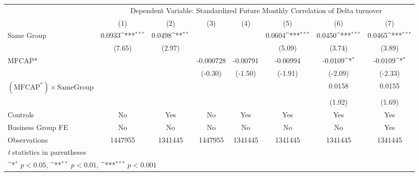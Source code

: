 {
\def\sym#1{\ifmmode^{#1}\else\(^{#1}\)\fi}
\begin{tabular}{l*{7}{c}}
\hline\hline
                &\multicolumn{7}{c}{Dependent Variable: Standardized Future Monthly Correlation of Delta turnover}                                   \\\cmidrule(lr){2-8}
                &\multicolumn{1}{c}{(1)}         &\multicolumn{1}{c}{(2)}         &\multicolumn{1}{c}{(3)}         &\multicolumn{1}{c}{(4)}         &\multicolumn{1}{c}{(5)}         &\multicolumn{1}{c}{(6)}         &\multicolumn{1}{c}{(7)}         \\
\hline
Same Group      &   0.0933\sym{***}&   0.0498\sym{**} &                  &                  &   0.0604\sym{***}&   0.0450\sym{***}&   0.0465\sym{***}\\
                &   (7.65)         &   (2.97)         &                  &                  &   (5.09)         &   (3.74)         &   (3.89)         \\
[1em]
$ \text{MFCAP*} $&                  &                  &-0.000728         & -0.00791         & -0.00994         &  -0.0109\sym{*}  &  -0.0109\sym{*}  \\
                &                  &                  &  (-0.30)         &  (-1.50)         &  (-1.91)         &  (-2.09)         &  (-2.33)         \\
[1em]
 $ (\text{MFCAP}^*) \times {\text{SameGroup} }  $ &                  &                  &                  &                  &                  &   0.0158         &   0.0155         \\
                &                  &                  &                  &                  &                  &   (1.92)         &   (1.69)         \\
\hline
Controls        &       No         &      Yes         &       No         &      Yes         &      Yes         &      Yes         &      Yes         \\
Business Group FE&       No         &       No         &       No         &       No         &       No         &       No         &      Yes         \\
Observations    &  1447955         &  1341445         &  1447955         &  1341445         &  1341445         &  1341445         &  1341445         \\
\hline\hline
\multicolumn{8}{l}{\footnotesize \textit{t} statistics in parentheses}\\
\multicolumn{8}{l}{\footnotesize \sym{*} \(p<0.05\), \sym{**} \(p<0.01\), \sym{***} \(p<0.001\)}\\
\end{tabular}
}
